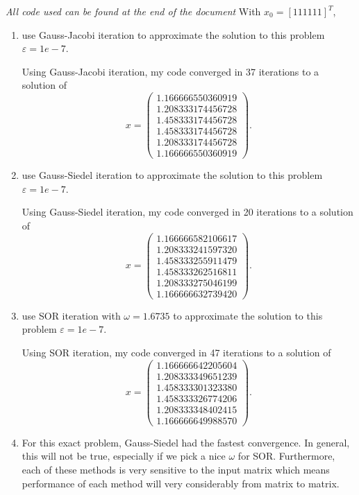 \documentclass[a4paper,12pt]{article}
\newcommand{\pmat}[1]{\begin{pmatrix} #1 \end{pmatrix}}
\begin{document}
\begin{enumerate}[label = \arabic*.]
	\emph{All code used can be found at the end of the document}
	With $ x_0 = [1 1 1 1 1 1]^T $,
	\begin{enumerate}[label = (\alph*)]
		\item use Gauss-Jacobi iteration to approximate the solution to this problem $ \varepsilon = 1e-7 $.
		
		Using Gauss-Jacobi iteration, my code converged in 37 iterations to a solution of
		\[
			x = \pmat{
				1.166666550360919 \\
				1.208333174456728 \\
				1.458333174456728 \\
				1.458333174456728 \\
				1.208333174456728 \\
				1.166666550360919
			}.
		\]
		
		\item use Gauss-Siedel iteration to approximate the solution to this problem $ \varepsilon = 1e-7 $.
		
		Using Gauss-Siedel iteration, my code converged in 20 iterations to a solution of
		\[
		x = \pmat{
			1.166666582106617 \\
			1.208333241597320 \\
			1.458333255911479 \\
			1.458333262516811 \\
			1.208333275046199 \\
			1.166666632739420
		}.
		\]
		
		\item use SOR iteration with $ \omega = 1.6735 $ to approximate the solution to this problem $ \varepsilon = 1e-7 $.
		
		Using SOR iteration, my code converged in 47 iterations to a solution of
		\[
		x = \pmat{
			1.166666642205604 \\
			1.208333349651239 \\
			1.458333301323380 \\
			1.458333326774206 \\
			1.208333348402415 \\
			1.166666649988570
			}.
		\]
		
		\item For this exact problem, Gauss-Siedel had the fastest convergence. In general, this will not be true, especially if we pick a nice $ \omega $ for SOR. Furthermore, each of these methods is very sensitive to the input matrix which means performance of each method will very considerably from matrix to matrix.
		

\end{enumerate}
\end{enumerate}
\end{document}
